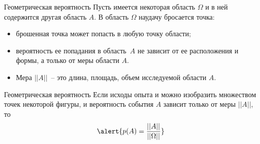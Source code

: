 \documentclass[unicode,11pt,notheorems,xcolor=table]{beamer}
\begin{document}
\begin{frame}{Геометрическая вероятность}
        Пусть имеется некоторая область $\Omega$ и в ней содержится другая область $A$. 
    В область $\Omega$ наудачу бросается точка:
    \begin{itemize}
        \item брошенная точка может попасть в любую точку области;
        \item вероятность  ее попадания в область~$A$ не зависит от ее расположения и формы, а только от меры области $A$.
        \item Мера $||A||$~-- это длина, площадь, объем  исследуемой области $A$. 
    \end{itemize}

    \begin{block}{Геометрическая вероятность}
        Если исходы опыта и можно изобразить множеством точек некоторой фигуры, и вероятность события $A$ зависит только от меры $||A||$, то
        $$
            \alert{p(A)=\frac{||A||}{||\Omega||}}
        $$
    \end{block}
\end{frame}
\end{document}
